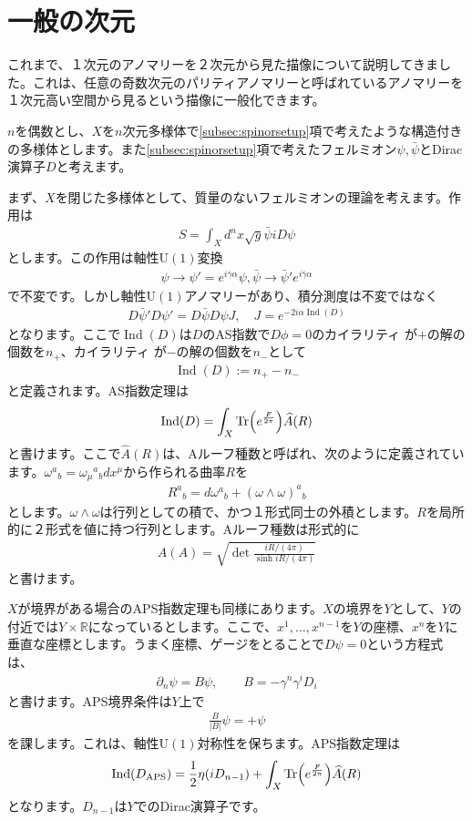\documentclass[paper=a4, fontsize=12pt, line_length=16cm, number_of_lines=33,dvipdfmx]{jlreq}
\numberwithin{equation}{section}
\newcommand{\del}{\partial}
\newcommand{\Rb}{\mathbb{R}}
\newcommand{\psib}{\bar{\psi}}
\newcommand{\gammab}{\bar{\gamma}}
\newcommand{\U}{\mathrm{U}}
\DeclareMathOperator{\Ind}{\mathrm{Ind}}
\newcommand{\DAPS}{D_{\mathrm{APS}}}
\newcommand{\Aroof}{\widehat{A}}
\begin{document}
\section{一般の次元}
これまで、１次元のアノマリーを２次元から見た描像について説明してきました。これは、任意の奇数次元のパリティアノマリーと呼ばれているアノマリーを１次元高い空間から見るという描像に一般化できます。

$n$を偶数とし、$X$を$n$次元多様体で\ref{subsec:spinorsetup}項で考えたような構造付きの多様体とします。また\ref{subsec:spinorsetup}項で考えたフェルミオン$\psi,\psib$とDirac演算子$D$と考えます。

まず、$X$を閉じた多様体として、質量のないフェルミオンの理論を考えます。作用は
\begin{align}
  S=\int_{X}d^n x \sqrt{g}\psib iD \psi
\end{align}
とします。この作用は軸性$\U(1)$変換
\begin{align}
  \psi\to \psi'=e^{i\gammab \alpha}\psi, \psib\to \psib'e^{i\gammab \alpha}
\end{align}
で不変です。しかし軸性$\U(1)$アノマリーがあり、積分測度は不変ではなく
\begin{align}
  D\psib' D\psi'=D\psib D\psi J,\quad J=e^{-2i\alpha \Ind(D)}
\end{align}
となります。ここで$\Ind(D)$は$D$のAS指数で$D\phi=0$のカイラリティ が$+$の解の個数を$n_{+}$、カイラリティ が$-$の解の個数を$n_{-}$として
\begin{align}
  \Ind(D):=n_{+}-n_{-}
\end{align}
と定義されます。AS指数定理は
\begin{align}
  \Ind(D)=\int_{X}\Tr(e^{\frac{F}{2\pi}})\Aroof(R)
\end{align}
と書けます。ここで$\Aroof(R)$は、Aルーフ種数と呼ばれ、次のように定義されています。$\omega^{a}{}_{b}=\omega_{\mu}{}^{a}{}_{b}dx^{\mu}$から作られる曲率$R$を
\begin{align}
  R^{a}{}_{b}=d\omega^{a}{}_{b}+(\omega\wedge \omega)^{a}{}_{b}
\end{align}
とします。$\omega\wedge \omega$は行列としての積で、かつ１形式同士の外積とします。$R$を局所的に２形式を値に持つ行列とします。Aルーフ種数は形式的に
\begin{align}
  \Aroof(A)=\sqrt{\det\frac{iR/(4\pi)}{\sinh iR/(4\pi)}}
\end{align}
と書けます。

$X$が境界がある場合のAPS指数定理も同様にあります。$X$の境界を$Y$として、$Y$の付近では$Y\times \Rb$になっているとします。ここで、$x^1,\dots,x^{n-1}$を$Y$の座標、$x^n$を$Y$に垂直な座標とします。うまく座標、ゲージをとることで$D\psi=0$という方程式は、
\begin{align}
  \del_{n}\psi=B\psi,\qquad B=-\gamma^{n}\gamma^{i}D_{i}
\end{align}
と書けます。APS境界条件は$Y$上で
\begin{align}
  \frac{B}{|B|}\psi=+\psi
\end{align}
を課します。これは、軸性$\U(1)$対称性を保ちます。APS指数定理は
\begin{align}
  \Ind(\DAPS)=\frac12 \eta(iD_{n-1})+\int_{X}\Tr(e^{\frac{F}{2\pi}})\Aroof(R)
\end{align}
となります。$D_{n-1}$は$Y$でのDirac演算子です。
\end{document}
